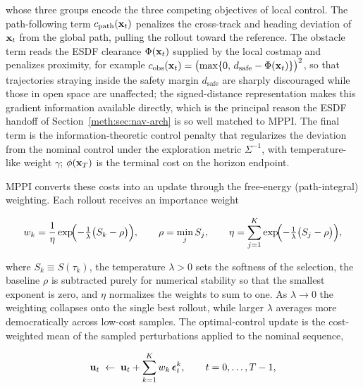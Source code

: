 whose three groups encode the three competing objectives of local control. The
path-following term $c_{\mathrm{path}}(\mathbf{x}_t)$ penalizes the cross-track and heading deviation of
$\mathbf{x}_t$ from the global path, pulling the rollout toward the reference. The obstacle term reads
the ESDF clearance $\Phi(\mathbf{x}_t)$ supplied by the local costmap and penalizes proximity, for
example
$c_{\mathrm{obs}}(\mathbf{x}_t)=\bigl(\max\{0,\,d_{\mathrm{safe}}-\Phi(\mathbf{x}_t)\}\bigr)^{2}$,
so that trajectories straying inside the safety margin $d_{\mathrm{safe}}$ are sharply
discouraged while those in open space are unaffected; the signed-distance representation makes
this gradient information available directly, which is the principal reason the ESDF handoff of
Section~\ref{meth:sec:nav-arch} is so well matched to MPPI. The final term is the information-theoretic
control penalty that regularizes the deviation from the nominal control under the exploration
metric $\Sigma^{-1}$, with temperature-like weight $\gamma$; $\phi(\mathbf{x}_T)$ is the terminal cost
on the horizon endpoint.

MPPI converts these costs into an update through the free-energy (path-integral) weighting. Each
rollout receives an importance weight

\begin{equation}\label{meth:eq:mppi-weight}
  w_k = \frac{1}{\eta}\exp\!\Bigl(-\tfrac{1}{\lambda}\bigl(S_k-\rho\bigr)\Bigr),
  \qquad
  \rho=\min_{j}S_j,
  \qquad
  \eta=\sum_{j=1}^{K}\exp\!\Bigl(-\tfrac{1}{\lambda}\bigl(S_j-\rho\bigr)\Bigr),
\end{equation}

where $S_k\equiv S(\tau_k)$, the temperature $\lambda>0$ sets the softness of the selection, the
baseline $\rho$ is subtracted purely for numerical stability so that the smallest exponent is
zero, and $\eta$ normalizes the weights to sum to one. As $\lambda\!\to\!0$ the weighting collapses
onto the single best rollout, while larger $\lambda$ averages more democratically across
low-cost samples. The optimal-control update is the cost-weighted mean of the sampled
perturbations applied to the nominal sequence,

\begin{equation}\label{meth:eq:mppi-update}
  \mathbf{u}_t \;\leftarrow\; \mathbf{u}_t + \sum_{k=1}^{K} w_k\,\bm{\epsilon}_t^{k},
  \qquad t=0,\dots,T-1,
\end{equation}


